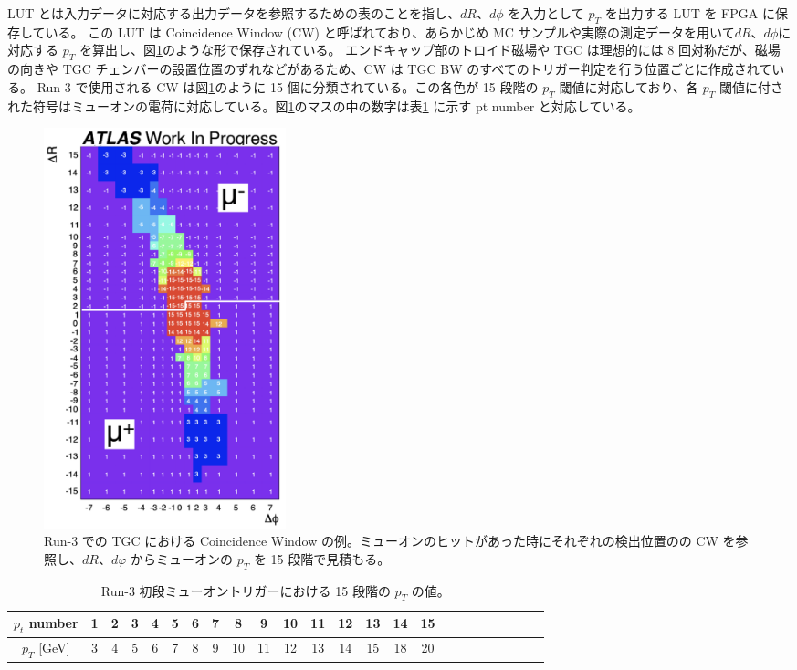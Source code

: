 LUT とは入力データに対応する出力データを参照するための表のことを指し、$dR$、$d\phi$ を入力として $p_T$ を出力する LUT を FPGA に保存している。
この LUT は Coincidence Window (CW) と呼ばれており、あらかじめ MC サンプルや実際の測定データを用いて$dR$、$d\phi$に対応する $p_T$ を算出し、図\ref{fig:CW}のような形で保存されている。
エンドキャップ部のトロイド磁場や TGC は理想的には 8 回対称だが、磁場の向きや TGC チェンバーの設置位置のずれなどがあるため、CW は TGC BW のすべてのトリガー判定を行う位置ごとに作成されている。
Run-3 で使用される CW は図\ref{fig:CW}のように 15 個に分類されている。この各色が 15 段階の $p_T$ 閾値に対応しており、各 $p_T$ 閾値に付された符号はミューオンの電荷に対応している。図\ref{fig:CW}のマスの中の数字は表\ref{pt_number} に示す pt number と対応している。

\begin{figure}[tb]
  \centering
  \includegraphics[clip, width=7cm]{fig/3/cw_run3_shiomi.png}
  \caption{Run-3 での TGC における Coincidence Window の例。ミューオンのヒットがあった時にそれぞれの検出位置のの CW を参照し、$dR$、$dφ$ からミューオンの $p_T$ を 15 段階で見積もる。}
  \label{fig:CW}
\end{figure}

\begin{table}[tb]
    \caption{Run-3 初段ミューオントリガーにおける 15 段階の $p_T$ の値。}
    \label{pt_number}
    \centering
    \begin{tabular}{|c|c|c|c|c|c|c|c|c|c|c|c|c|c|c|c|c|c|c|c|c|c|c|c|}
        \hline
        $p_t$ number & 1 & 2 & 3 & 4 & 5 & 6 & 7 & 8 & 9 & 10 & 11 & 12 & 13 & 14 & 15\\
        \hline
        $p_T$ [GeV] & 3 & 4 & 5 & 6 & 7 & 8 & 9 & 10 & 11 & 12 & 13 & 14 & 15 & 18 & 20\\
        \hline
    \end{tabular}
\end{table}

